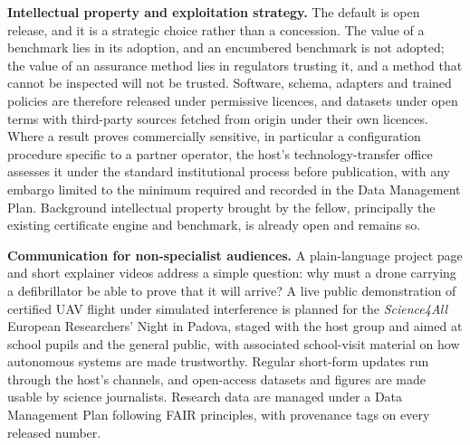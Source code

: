 \documentclass[11pt,a4paper]{article}
\begin{document}
\textbf{Intellectual property and exploitation strategy.} The default is open
release, and it is a strategic choice rather than a concession. The value of a
benchmark lies in its adoption, and an encumbered benchmark is not adopted; the
value of an assurance method lies in regulators trusting it, and a method that
cannot be inspected will not be trusted. Software, schema, adapters and trained
policies are therefore released under permissive licences, and datasets under
open terms with third-party sources fetched from origin under their own
licences. Where a result proves commercially sensitive, in particular a
configuration procedure specific to a partner operator, the host's
technology-transfer office assesses it under the standard institutional process
before publication, with any embargo limited to the minimum required and
recorded in the Data Management Plan. Background intellectual property brought
by the fellow, principally the existing certificate engine and benchmark, is
already open and remains so.

\textbf{Communication for non-specialist audiences.} A plain-language project page and short explainer videos address a simple question: why must a drone carrying a defibrillator be able to prove that it will arrive? A live public demonstration of certified UAV flight under simulated interference is planned for the \emph{Science4All} European Researchers' Night in Padova, staged with the host group and aimed at school pupils and the general public, with associated school-visit material on how autonomous systems are made trustworthy. Regular short-form updates run through the host's channels, and open-access datasets and figures are made usable by science journalists. Research data are managed under a Data Management Plan following FAIR principles, with provenance tags on every released number.
\end{document}
